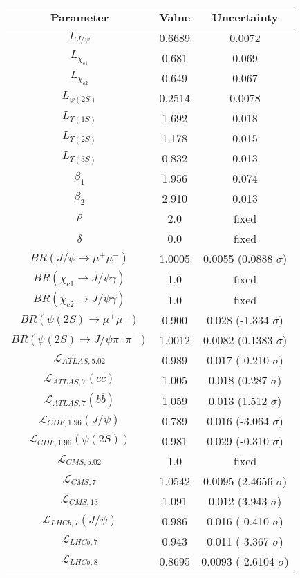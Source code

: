 \begin{table}[h!]
\centering
\begin{tabular}{c|c|c}
Parameter & Value & Uncertainty \\
\hline
$L_{J/\psi}$ & 0.6689 & 0.0072 \\
$L_{\chi_{c1}}$ & 0.681 & 0.069 \\
$L_{\chi_{c2}}$ & 0.649 & 0.067 \\
$L_{\psi(2S)}$ & 0.2514 & 0.0078 \\
$L_{\Upsilon(1S)}$ & 1.692 & 0.018 \\
$L_{\Upsilon(2S)}$ & 1.178 & 0.015 \\
$L_{\Upsilon(3S)}$ & 0.832 & 0.013 \\
$\beta_1$ & 1.956 & 0.074 \\
$\beta_2$ & 2.910 & 0.013 \\
$\rho$ & 2.0 & fixed \\
$\delta$ & 0.0 & fixed \\
$BR(J/\psi\rightarrow\mu^+\mu^-)$ & 1.0005 & 0.0055 (0.0888 $\sigma$) \\
$BR(\chi_{c1}\rightarrow J/\psi\gamma)$ & 1.0 & fixed \\
$BR(\chi_{c2}\rightarrow J/\psi\gamma)$ & 1.0 & fixed \\
$BR(\psi(2S)\rightarrow\mu^+\mu^-)$ & 0.900 & 0.028 (-1.334 $\sigma$) \\
$BR(\psi(2S)\rightarrow J/\psi\pi^+\pi^-)$ & 1.0012 & 0.0082 (0.1383 $\sigma$) \\
$\mathcal L_{ATLAS,5.02}$ & 0.989 & 0.017 (-0.210 $\sigma$) \\
$\mathcal L_{ATLAS,7}(c\overline c)$ & 1.005 & 0.018 (0.287 $\sigma$) \\
$\mathcal L_{ATLAS,7}(b\overline b)$ & 1.059 & 0.013 (1.512 $\sigma$) \\
$\mathcal L_{CDF,1.96}(J/\psi)$ & 0.789 & 0.016 (-3.064 $\sigma$) \\
$\mathcal L_{CDF,1.96}(\psi(2S))$ & 0.981 & 0.029 (-0.310 $\sigma$) \\
$\mathcal L_{CMS,5.02}$ & 1.0 & fixed \\
$\mathcal L_{CMS,7}$ & 1.0542 & 0.0095 (2.4656 $\sigma$) \\
$\mathcal L_{CMS,13}$ & 1.091 & 0.012 (3.943 $\sigma$) \\
$\mathcal L_{LHCb,7}(J/\psi)$ & 0.986 & 0.016 (-0.410 $\sigma$) \\
$\mathcal L_{LHCb,7}$ & 0.943 & 0.011 (-3.367 $\sigma$) \\
$\mathcal L_{LHCb,8}$ & 0.8695 & 0.0093 (-2.6104 $\sigma$) \\

\end{tabular}
\end{table}
